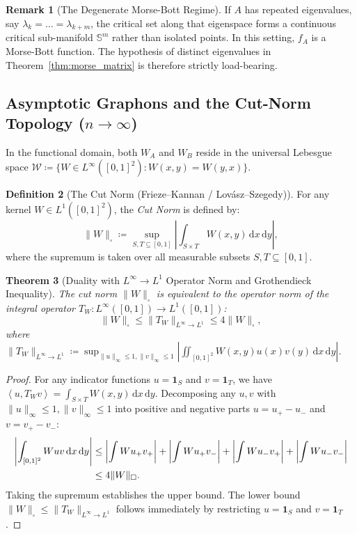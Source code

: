 \documentclass[11pt,a4paper,reqno]{amsart}
\newtheorem{theorem}{Theorem}[section]
\theoremstyle{definition}
\newtheorem{definition}[theorem]{Definition}
\newtheorem{remark}[theorem]{Remark}
\numberwithin{equation}{section}
\newcommand{\Sph}{\mathbb{S}}
\newcommand{\cutnorm}[1]{\|#1\|_{\square}}
\newcommand{\inner}[2]{\left\langle #1, #2 \right\rangle}
\newcommand{\dif}{\,\mathrm{d}}
\begin{document}
\begin{remark}[The Degenerate Morse-Bott Regime]
If $A$ has repeated eigenvalues, say $\lambda_k = \dots = \lambda_{k+m}$, the critical set along that eigenspace forms a continuous critical sub-manifold $\Sph^m$ rather than isolated points. In this setting, $f_A$ is a Morse-Bott function. The hypothesis of distinct eigenvalues in Theorem~\ref{thm:morse_matrix} is therefore strictly load-bearing.
\end{remark}

\subsection{Asymptotic Graphons and the Cut-Norm Topology ($n \to \infty$)}
\label{subsec:graphon_cutnorm}

In the functional domain, both $W_A$ and $W_B$ reside in the universal Lebesgue space $\mathcal{W} \coloneqq \{W \in L^\infty([0, 1]^2) \colon W(x, y) = W(y, x)\}$.

\begin{definition}[The Cut Norm (Frieze--Kannan / Lov\'asz--Szegedy)]
For any kernel $W \in L^1([0, 1]^2)$, the \emph{Cut Norm} is defined by:
\begin{equation}
    \label{eq:cut_norm_def}
    \cutnorm{W} \coloneqq \sup_{S, T \subseteq [0, 1]} \left| \int_{S \times T} W(x, y) \dif x \dif y \right|,
\end{equation}
where the supremum is taken over all measurable subsets $S, T \subseteq [0, 1]$.
\end{definition}

\begin{theorem}[Duality with $L^\infty \to L^1$ Operator Norm and Grothendieck Inequality]
\label{thm:grothendieck_cutnorm}
The cut norm $\cutnorm{W}$ is equivalent to the operator norm of the integral operator $T_W \colon L^\infty([0,1]) \to L^1([0,1])$:
\begin{equation}
    \cutnorm{W} \le \|T_W\|_{L^\infty \to L^1} \le 4 \cutnorm{W},
\end{equation}
where $\|T_W\|_{L^\infty \to L^1} \coloneqq \sup_{\|u\|_\infty \le 1, \|v\|_\infty \le 1} \left| \iint_{[0,1]^2} W(x, y) u(x) v(y) \dif x \dif y \right|$.
\end{theorem}

\begin{proof}
For any indicator functions $u = \mathbf{1}_S$ and $v = \mathbf{1}_T$, we have $\inner{u}{T_W v} = \int_{S \times T} W(x,y) \dif x \dif y$. Decomposing any $u, v$ with $\|u\|_\infty \le 1, \|v\|_\infty \le 1$ into positive and negative parts $u = u_+ - u_-$ and $v = v_+ - v_-$:
\begin{align}
    \left|\int_{[0,1]^2} W u v \dif x \dif y\right| 
    &\le \left|\int W u_+ v_+\right| + \left|\int W u_+ v_-\right| + \left|\int W u_- v_+\right| + \left|\int W u_- v_-\right| \notag \\
    &\le 4 \cutnorm{W}.
\end{align}
Taking the supremum establishes the upper bound. The lower bound $\cutnorm{W} \le \|T_W\|_{L^\infty \to L^1}$ follows immediately by restricting $u = \mathbf{1}_S$ and $v = \mathbf{1}_T$.
\end{proof}
\end{document}
